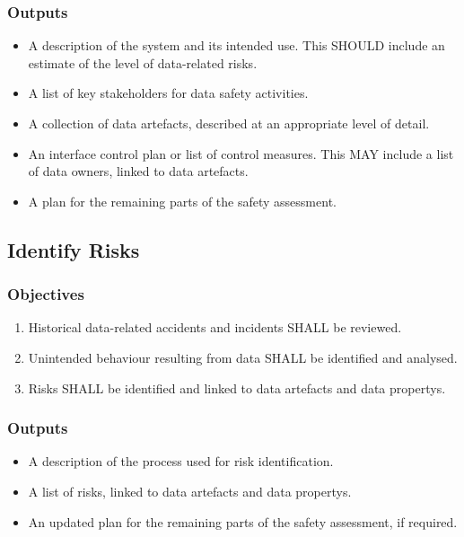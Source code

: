 \subsubsection{Outputs}
\begin{itemize}
	\item A description of the system and its intended use. This SHOULD include an estimate of the level of data-related risks.
	\item A list of key \glspl{stakeholder} for data safety activities.
	\item A collection of \glspl{data artefact}, described at an appropriate level of detail.
	\item An interface control plan or list of control measures. This MAY include a list of \glspl{data owner}, linked to \glspl{data artefact}.
	\item A plan for the remaining parts of the \gls{safety assessment}.
\end{itemize}

\subsection{Identify Risks}
\subsubsection{Objectives}
\begin{enumerate}[label=\color{dsiwgAccentColour}{2-\arabic*}]
	\item Historical data-related accidents and incidents SHALL be reviewed.
	\item Unintended behaviour resulting from data SHALL be identified and analysed.
	\item Risks SHALL be identified and linked to \glspl{data artefact} and \glspl{data property}.
\end{enumerate}

\subsubsection{Outputs}
\begin{itemize}
	\item A description of the process used for risk identification.
	\item A list of risks, linked to \glspl{data artefact} and \glspl{data property}.
	\item An updated plan for the remaining parts of the \gls{safety assessment}, if required.
\end{itemize}

